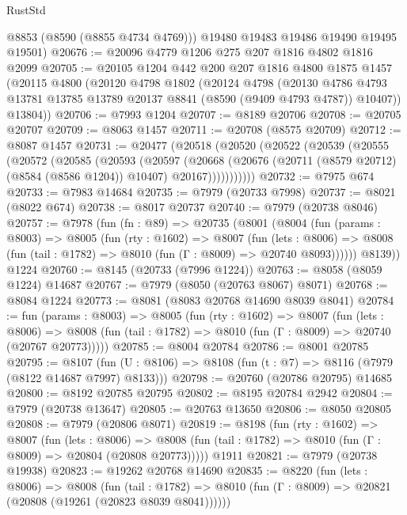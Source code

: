 \begin{lexlean}{RustStd}
\begin{coremodule}
        @8853
        (@8590 (@8855 @4734 @4769)))
      @19480
      @19483
      @19486
      @19490
      @19495
      @19501)
@20676 := @20096 @4779 @1206 @275 @207 @1816 @4802 @1816 @2099
@20705 := @20105
    @1204
    @442
    @200
    @207
    @1816
    @4800
    @1875
    @1457
    (@20115
      @4800
      (@20120
        @4798
        @1802
        (@20124
          @4798
          (@20130 @4786 @4793 @13781 @13785 @13789 @20137 @8841 (@8590 (@9409 @4793 @4787)) @10407))
        @13804))
@20706 := @7993 @1204
@20707 := @8189 @20706
@20708 := @20705 @20707
@20709 := @8063 @1457
@20711 := @20708 (@8575 @20709)
@20712 := @8087 @1457
@20731 := @20477
    (@20518
      (@20520
        (@20522
          (@20539
            (@20555
              (@20572
                (@20585
                  (@20593
                    (@20597
                      (@20668
                        (@20676
                          (@20711 (@8579 @20712) (@8584 (@8586 @1204)) @10407)
                          @20167)))))))))))
@20732 := @7975 @674
@20733 := @7983 @14684
@20735 := @7979 (@20733 @7998)
@20737 := @8021 (@8022 @674)
@20738 := @8017 @20737
@20740 := @7979 (@20738 @8046)
@20757 := @7978
    (fun (fn : @89) =>
    @20735
      (@8001
        (@8004
          (fun (params : @8003) =>
          @8005
            (fun (rty : @1602) =>
            @8007
              (fun (lets : @8006) =>
              @8008 (fun (tail : @1782) => @8010 (fun (Γ : @8009) => @20740 @8093))))))
        @8139))
    @1224
@20760 := @8145 (@20733 (@7996 @1224))
@20763 := @8058 (@8059 @1224) @14687
@20767 := @7979 (@8050 (@20763 @8067) @8071)
@20768 := @8084 @1224
@20773 := @8081 (@8083 @20768 @14690 @8039 @8041)
@20784 := fun (params : @8003) =>
  @8005
    (fun (rty : @1602) =>
    @8007
      (fun (lets : @8006) =>
      @8008 (fun (tail : @1782) => @8010 (fun (Γ : @8009) => @20740 (@20767 @20773)))))
@20785 := @8004 @20784
@20786 := @8001 @20785
@20795 := @8107
    (fun (U : @8106) => @8108 (fun (t : @7) => @8116 (@7979 (@8122 @14687 @7997) @8133)))
@20798 := @20760 (@20786 @20795) @14685
@20800 := @8192 @20785 @20795
@20802 := @8195 @20784 @2942
@20804 := @7979 (@20738 @13647)
@20805 := @20763 @13650
@20806 := @8050 @20805
@20808 := @7979 (@20806 @8071)
@20819 := @8198
    (fun (rty : @1602) =>
    @8007
      (fun (lets : @8006) =>
      @8008 (fun (tail : @1782) => @8010 (fun (Γ : @8009) => @20804 (@20808 @20773)))))
    @1911
@20821 := @7979 (@20738 @19938)
@20823 := @19262 @20768 @14690
@20835 := @8220
    (fun (lets : @8006) =>
    @8008
      (fun (tail : @1782) =>
      @8010 (fun (Γ : @8009) => @20821 (@20808 (@19261 (@20823 @8039 @8041))))))

\end{coremodule}
\end{lexlean}
